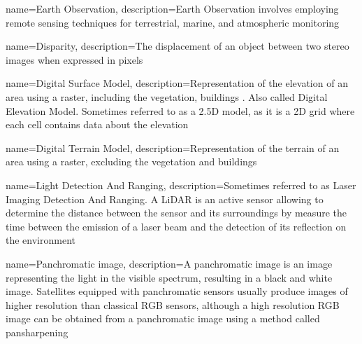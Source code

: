 {%
    name={Earth Observation},
    description={Earth Observation involves employing remote sensing techniques for terrestrial, marine, and atmospheric monitoring}
}

{%
    name={Disparity},
    description={The displacement of an object between two stereo images when expressed in pixels}
}

{%
    name=Digital Surface Model,
    description={Representation of the elevation of an area using a raster, including the vegetation, buildings \etc. Also called Digital Elevation Model. Sometimes referred to as a 2.5D model, as it is a 2D grid where each cell contains data about the elevation}
}

{%
    name={Digital Terrain Model},
    description={Representation of the terrain of an area using a raster, excluding the vegetation and buildings}
}

{%
    name={Light Detection And Ranging},
    description={Sometimes referred to as Laser Imaging Detection And Ranging. A LiDAR is an active sensor allowing to determine the distance between the sensor and its surroundings by measure the time between the emission of a laser beam and the detection of its reflection on the environment}
}

{%
    name={Panchromatic image},
    description={A panchromatic image is an image representing the light in the visible spectrum, resulting in a black and white image. Satellites equipped with panchromatic sensors usually produce images of higher resolution than classical RGB sensors, although a high resolution RGB image can be obtained from a panchromatic image using a method called pansharpening}
}

